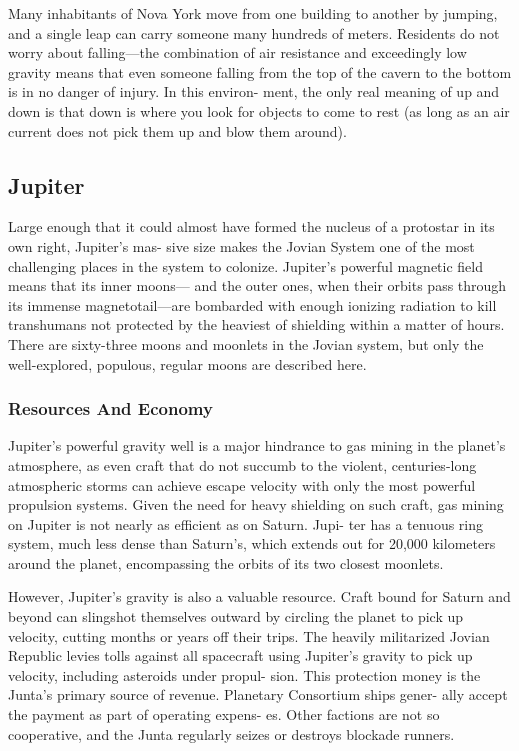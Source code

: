 Many inhabitants of Nova York move from one 
building to another by jumping, and a single leap can 
carry someone many hundreds of meters. Residents 
do not worry about falling—the combination of air 
resistance and exceedingly low gravity means that 
even someone falling from the top of the cavern to 
the bottom is in no danger of injury. In this environ-
ment, the only real meaning of up and down is that 
down is where you look for objects to come to rest 
(as long as an air current does not pick them up and 
blow them around).

\subsection{Jupiter}

Large enough that it could almost have formed the 
nucleus of a protostar in its own right, Jupiter's mas-
sive size makes the Jovian System one of the most 
challenging places in the system to colonize. Jupiter's 
powerful magnetic field means that its inner moons—
and the outer ones, when their orbits pass through its 
immense magnetotail—are bombarded with enough 
ionizing radiation to kill transhumans not protected 
by the heaviest of shielding within a matter of hours. 
There are sixty-three moons and moonlets in the 
Jovian system, but only the well-explored, populous, 
regular moons are described here.

\subsubsection{Resources And Economy}

Jupiter's powerful gravity well is a major hindrance 
to gas mining in the planet's atmosphere, as even craft 
that do not succumb to the violent, centuries-long 
atmospheric storms can achieve escape velocity with 
only the most powerful propulsion systems. Given the 
need for heavy shielding on such craft, gas mining on 
Jupiter is not nearly as efficient as on Saturn. Jupi-
ter has a tenuous ring system, much less dense than 
Saturn's, which extends out for 20,000 kilometers 
around the planet, encompassing the orbits of its two 
closest moonlets.

However, Jupiter's gravity is also a valuable 
resource. Craft bound for Saturn and beyond can 
slingshot themselves outward by circling the planet 
to pick up velocity, cutting months or years off their 
trips. The heavily militarized Jovian Republic levies 
tolls against all spacecraft using Jupiter's gravity to 
pick up velocity, including asteroids under propul-
sion. This protection money is the Junta's primary 
source of revenue. Planetary Consortium ships gener-
ally accept the payment as part of operating expens-
es. Other factions are not so cooperative, and the 
Junta regularly seizes or destroys blockade runners.

